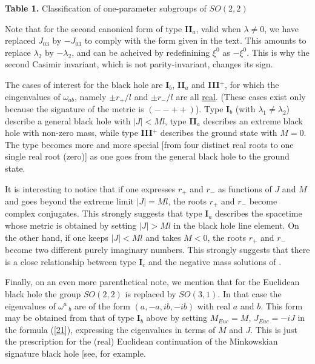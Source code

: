 \centerline{{\bf Table 1.} Classification of one-parameter subgroups of
 $SO(2,2)$}
\vspace{7mm}

Note that for the second canonical form of type {\bf II}$_a$, valid when
 $\lambda \not= 0$, we have replaced $J_{03}$ by $-J_{03}$ to comply with the
 form given in the text. This amounts to replace $\lambda_2$ by $-\lambda_2$,
 and can be acheived by redefinining $\xi^0$ as $-\xi^0$. This is why the
second Casimir invariant, which is not parity-invariant, changes its sign.


The cases of interest for the black hole are {\bf
I}$_b$, {\bf II}$_a$ and {\bf III}$^+$, for which the
eingenvalues of $\omega_{ab}$, namely $\pm r_{+}/l$ and $\pm r_{-}/l$  are all
 \underline{real}. (These cases exist only because
the signature of the metric is $(--++)$). Type {\bf I}$_b$ (with
$\lambda_1\neq \lambda_2$) describe a general black hole with
$|J|<Ml$, type {\bf II}$_a$ describes an extreme black hole with
non-zero mass, while type {\bf III}$^+$ describes the ground
state with $M=0$. The type becomes more and more special [from four
distinct real roots to one single real root (zero)] as one goes
from the general black hole to the ground state.

It is interesting to notice that if one expresses $r_+$ and
$r_-$ as functions of $J$ and $M$ and goes beyond the extreme
limit $|J|=Ml$, the roots $r_+$ and $r_-$ become complex
conjugates. This strongly suggests that type {\bf I}$_a$
describes the spacetime whose metric is obtained by setting
$|J|>Ml$ in the black hole line element. On the other hand, if
one keeps $|J|<Ml$ and takes $M<0$, the roots $r_+$ and $r_-$
become two different purely imaginary numbers. This strongly
suggests that there is a close relationship between type {\bf
I}$_c$ and the negative mass solutions of \cite{5}.

Finally, on an even more parenthetical note, we mention that for
the Euclidean black hole the group $SO(2,2)$ is replaced by
$SO(3,1)$. In that case the eigenvalues of $\omega^a\,_b$ are of
the form $(a, -a, ib, -ib)$ with real $a$ and $b$. This form may
be obtained from that of type {\bf I}$_b$ above by setting
$M_{Euc}=M$, $J_{Euc}=-iJ$ in the formula (\ref{21}), expressing
the eigenvalues in terms of $M$ and $J$. This is just the
prescription for the (real) Euclidean continuation of the
Minkowskian signature black hole [see, for example\cite{1}.

\vspace{1cm}

